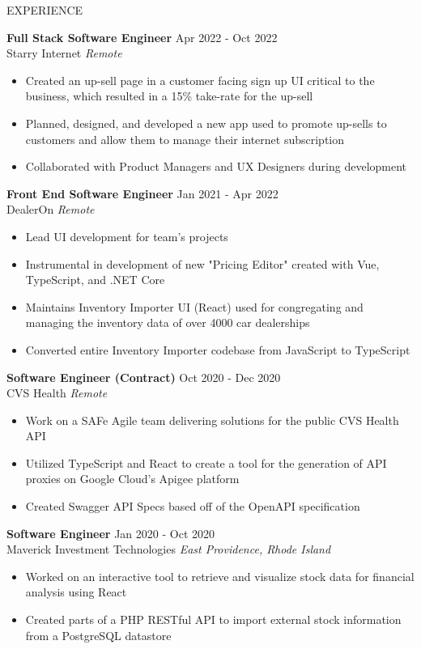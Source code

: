 \documentclass{resume} %
\begin{document}
\begin{rSection}{EXPERIENCE}

\textbf{Full Stack Software Engineer} \hfill  Apr 2022 - Oct 2022\\
Starry Internet \hfill  \textit{Remote}
 \begin{itemize}
    \itemsep -3pt {}
    \item Created an up-sell page in a customer facing sign up UI critical to the business, which resulted in a 15\% take-rate for the up-sell
     \item Planned, designed, and developed a new app used to promote up-sells to customers and allow them to manage their internet subscription
     \item Collaborated with Product Managers and UX Designers during development
 \end{itemize}

\textbf{Front End Software Engineer} \hfill  Jan 2021 - Apr 2022\\
DealerOn \hfill  \textit{Remote}
 \begin{itemize}
    \itemsep -3pt {}
    \item Lead UI development for team's projects
     \item Instrumental in development of new "Pricing Editor" created with Vue, TypeScript, and .NET Core
     \item Maintains Inventory Importer UI (React) used for congregating and managing the inventory data of over 4000 car dealerships
     \item Converted entire Inventory Importer codebase from JavaScript to TypeScript
 \end{itemize}

 \textbf{Software Engineer (Contract)} \hfill  Oct 2020 - Dec 2020\\
CVS Health \hfill \textit{Remote}
 \begin{itemize}
    \itemsep -3pt {} 
     \item Work on a SAFe Agile team delivering solutions for the public CVS Health API 
     \item Utilized TypeScript and React to create a tool for the generation of API proxies on Google Cloud's Apigee platform
     \item Created Swagger API Specs based off of the OpenAPI specification

    
 \end{itemize}

\textbf{Software Engineer} \hfill Jan 2020 - Oct 2020\\
Maverick Investment Technologies \hfill \textit{East Providence, Rhode Island}
 \begin{itemize}
    \itemsep -3pt {} 
    \item Worked on an interactive tool to retrieve and visualize stock data for financial analysis using React
    \item Created parts of a PHP RESTful API to import external stock information from a PostgreSQL datastore 
 \end{itemize}
 
\end{rSection} 
\end{document}
